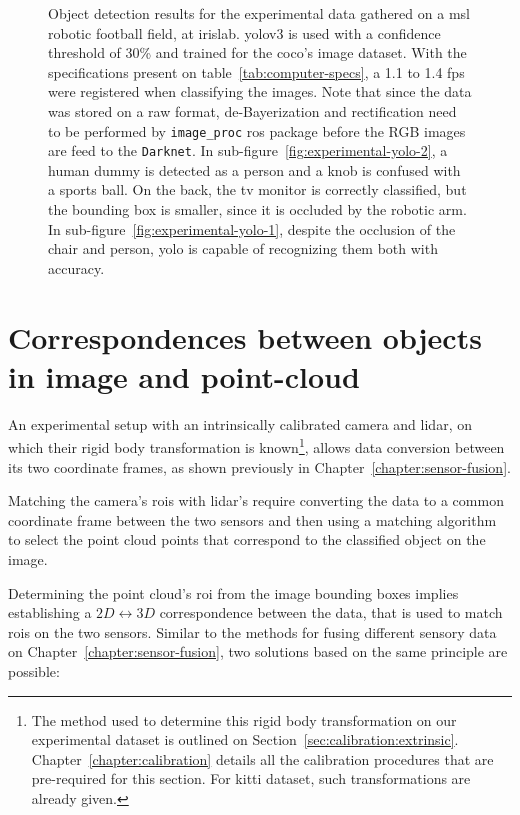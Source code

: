 \begin{figure}[!ht]
\begin{subfigure}[t]{0.45\textwidth}
	\end{subfigure}
	\caption{Object detection results for the experimental data gathered on a \ac{msl} robotic football field, at \ac{irislab}. \ac{yolo}v3 is used with a confidence threshold of 30\% and trained for the \ac{coco}'s image dataset. With the specifications present on table~\ref{tab:computer-specs}, a 1.1 to 1.4 \ac{fps} were registered when classifying the images. Note that since the data was stored on a raw format, de-Bayerization and rectification need to be performed by \texttt{image\_proc} \ac{ros} package before the RGB images are feed to the \texttt{Darknet}. In sub-figure~\ref{fig:experimental-yolo-2}, a human dummy is detected as a person and a knob is confused with a sports ball. On the back, the tv monitor is correctly classified, but the bounding box is smaller, since it is occluded by the robotic arm. In sub-figure~\ref{fig:experimental-yolo-1}, despite the occlusion of the chair and person, \ac{yolo} is capable of recognizing them both with accuracy.}
	\label{fig:experimental-object-detection}
\end{figure}


\section{Correspondences between objects in image and point-cloud}
\label{sec:object-detection:correspondences-image-point-cloud}
An experimental setup with an intrinsically calibrated camera and \ac{lidar}, on which their rigid body transformation is known\footnote{The method used to determine this rigid body transformation on our experimental dataset is outlined on Section~\ref{sec:calibration:extrinsic}. Chapter~\ref{chapter:calibration} details all the calibration procedures that are pre-required for this section. For \ac{kitti} dataset, such transformations are already given.}, allows data conversion between its two coordinate frames, as shown previously in Chapter~\ref{chapter:sensor-fusion}. 

Matching the camera's \acp{roi} with \ac{lidar}'s require converting the data to a common coordinate frame between the two sensors and then using a matching algorithm to select the point cloud points that correspond to the classified object on the image.

Determining the point cloud's \ac{roi} from the image bounding boxes implies establishing a $2D \leftrightarrow 3D$ correspondence between the data, that is used to match \acp{roi} on the two sensors. Similar to the methods for fusing different sensory data on Chapter~\ref{chapter:sensor-fusion}, two solutions based on the same principle are possible:


